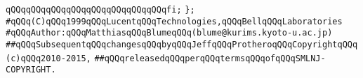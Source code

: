 \verb|qQQqqQQqqQQqqQQqqQQqqQQqqQQqqQQqfi;|\newline
\verb|};|\newline
\newline
\newline
\verb|#qQQq(C)qQQq1999qQQqLucentqQQqTechnologies,qQQqBellqQQqLaboratories|\newline
\verb|#qQQqAuthor:qQQqMatthiasqQQqBlumeqQQq(blume@kurims.kyoto-u.ac.jp)|\newline
\verb|##qQQqSubsequentqQQqchangesqQQqbyqQQqJeffqQQqProtheroqQQqCopyrightqQQq(c)qQQq2010-2015,|\newline
\verb|##qQQqreleasedqQQqperqQQqtermsqQQqofqQQqSMLNJ-COPYRIGHT.|\newline

